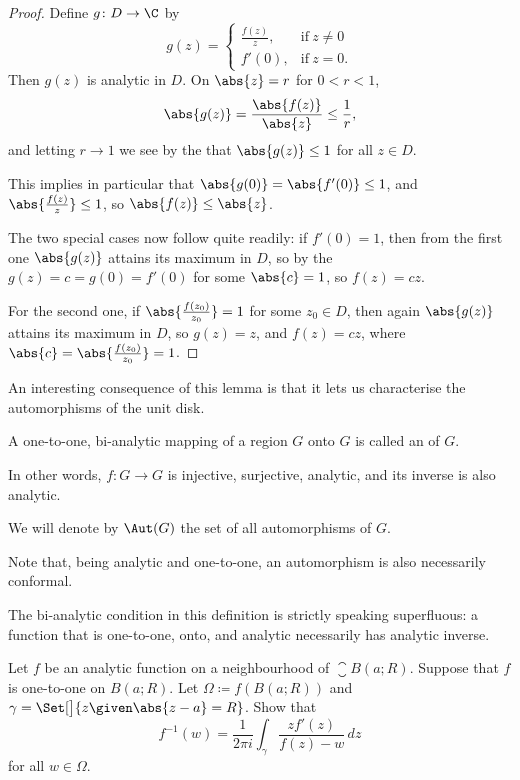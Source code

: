 \begin{proof}
	Define $g \colon D \to \C$ by
	\[
		g(z) = \begin{cases}
			\frac{f(z)}{z}, & \text{if}~ z \neq 0 \\
			f'(0), & \text{if}~ z = 0.
		\end{cases}
	\]
	Then $g(z)$ is analytic in $D$.
	On $\abs{z} = r$ for $0 < r < 1$,
	\[
		\abs{g(z)} = \frac{\abs{f(z)}}{\abs{z}} \leq \frac{1}{r},
	\]
	and letting $r \to 1$ we see by the  that $\abs{g(z)} \leq 1$ for all $z \in D$.

	This implies in particular that $\abs{g(0)} = \abs{f'(0)} \leq 1$, and $\abs{\frac{f(z)}{z}} \leq 1$, so $\abs{f(z)} \leq \abs{z}$.

	The two special cases now follow quite readily: if $f'(0) = 1$, then from the first one $\abs{g(z)}$ attains its maximum in $D$, so by the  $g(z) = c = g(0) = f'(0)$ for some $\abs{c} = 1$, so $f(z) = c z$.

	For the second one, if $\abs{\frac{f(z_0)}{z_0}} = 1$ for some $z_0 \in D$, then again $\abs{g(z)}$ attains its maximum in $D$, so $g(z) = z$, and $f(z) = c z$, where $\abs{c} = \abs{\frac{f(z_0)}{z_0}} = 1$.
\end{proof}

\label{automorphismsunitdisk}

An interesting consequence of this lemma is that it lets us characterise the automorphisms of the unit disk.

\begin{definition}[Automorphism]
	A one-to-one, bi-analytic mapping of a region $G$ onto $G$ is called an  of $G$.

	In other words, $f \colon G \to G$ is injective, surjective, analytic, and its inverse is also analytic.

	We will denote by $\Aut(G)$ the set of all automorphisms of $G$.
\end{definition}

Note that, being analytic and one-to-one, an automorphism is also necessarily conformal.

\begin{remark}
	The bi-analytic condition in this definition is strictly speaking superfluous: a function that is one-to-one, onto, and analytic necessarily has analytic inverse.
\end{remark}

\begin{exercise}\label{hw4.2}
	Let $f$ be an analytic function on a neighbourhood of $\closure{B(a; R)}$.
	Suppose that $f$ is one-to-one on $B(a; R)$.
	Let $\Omega \coloneqq f(B(a; R))$ and $\gamma = \Set[\big]{z \given \abs{z - a} = R}$.
	Show that
	\[
		f^{-1}(w) = \frac{1}{2 \pi i} \int_\gamma \frac{z f'(z)}{f(z) - w} \, d z
	\]
	for all $w \in \Omega$.
\end{exercise}

